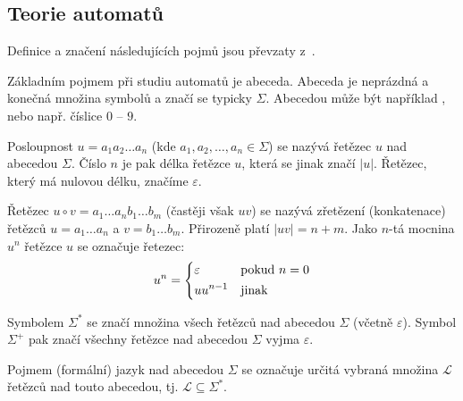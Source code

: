 \subsection{Teorie automatů}
Definice a značení následujících pojmů jsou převzaty z~\cite{Koz-AutComp}.

Základním pojmem při studiu automatů je abeceda. Abeceda je neprázdná a konečná množina symbolů a značí se typicky $\Sigma$. Abecedou může být například , nebo např. číslice $0$ -- $9$.

Posloupnost $u = a_1 a_2 \dots a_n$ (kde $a_1,  a_2, \dots, a_n \in \Sigma$) se nazývá řetězec $u$ nad abecedou $\Sigma$. Číslo $n$ je pak délka řetězce $u$, která se jinak značí $|u|$. Řetězec, který má nulovou délku, značíme $\varepsilon$.

Řetězec $u \circ v = a_1 \dots a_n b_1 \dots b_m$ (častěji však $uv$) se nazývá zřetězení (konkatenace) řetězců $u = a_1 \dots a_n$ a $v = b_1 \dots b_m$. Přirozeně platí $|uv| = n + m$. Jako $n$-tá mocnina $u^n$ řetězce $u$ se označuje řetezec:
$$
  u^n = \begin{dcases}
    \varepsilon & \text{pokud } n = 0\\
    u u^{n-1} & \text{jinak}
  \end{dcases}
$$

Symbolem $\Sigma^*$ se značí množina všech řetězců nad abecedou $\Sigma$ (včetně $\varepsilon$). Symbol $\Sigma^+$ pak značí všechny řetězce nad abecedou $\Sigma$ vyjma $\varepsilon$. 

Pojmem (formální) jazyk nad abecedou $\Sigma$ se označuje určitá vybraná množina $\mathcal{L}$ řetězců nad touto abecedou, tj. $\mathcal{L} \subseteq \Sigma^*$.

%   

